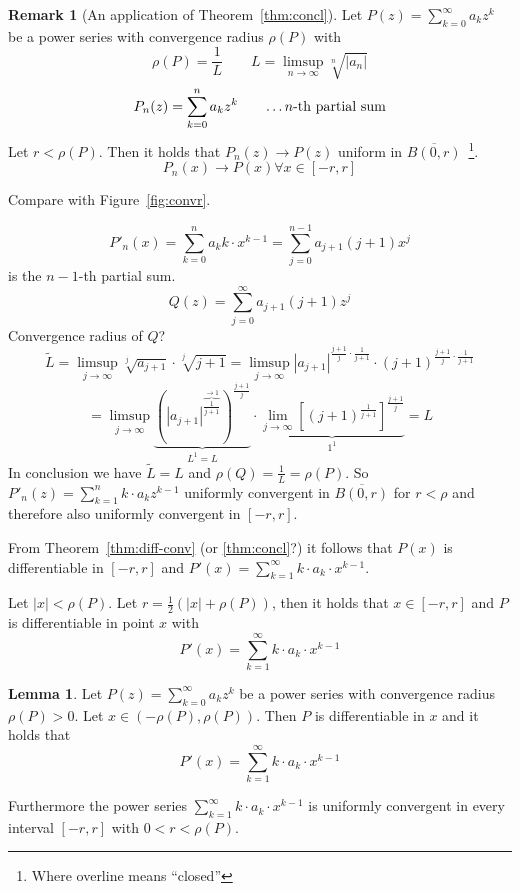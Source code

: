 \documentclass[a4paper,landscape,twocolumn]{article}
\theoremstyle{definition}
\newtheorem{rem}{Remark}
\newtheorem{lemma}{Lemma}
\newcommand\abs[1]{\left|#1\right|}
\begin{document}
\begin{rem}[An application of Theorem~\ref{thm:concl}]
  Let $P(z) = \sum_{k=0}^\infty a_k z^k$ be a power series with convergence radius $\rho(P)$ with
  \[ \rho(P) = \frac1L \qquad L = \limsup_{n\to\infty} \sqrt[n]{\abs{a_n}} \]
  \[ P_n(z) = \sum_{k=0}^n a_k z^k \qquad \text{\dots $n$-th partial sum} \]
  Let $r < \rho(P)$. Then it holds that $P_n(z) \to P(z)$ uniform in $\overline{B(0,r)}$~\footnote{Where overline means \enquote{closed}}.
  \[ P_n(x) \to P(x) \forall x \in [-r, r] \]

  Compare with Figure~\ref{fig:convr}.

  \[ P'_n(x) = \sum_{k=0}^n a_k k \cdot x^{k-1} = \sum_{j=0}^{n-1} a_{j+1} (j + 1) x^j \]
  is the $n-1$-th partial sum.
  \[ Q(z) = \sum_{j=0}^\infty a_{j+1} (j + 1) z^j \]
  Convergence radius of $Q$?
  \[ \tilde{L} = \limsup_{j\to\infty} \sqrt[j]{a_{j+1}} \cdot \sqrt[j]{j + 1} = \limsup_{j \to \infty} \abs{a_{j+1}}^{\frac{j+1}{j} \cdot \frac{1}{j+1}} \cdot (j+1)^{\frac{j+1}{j} \cdot \frac{1}{j+1}} \]
  \[
    = \limsup_{j\to\infty} \underbrace{\left(\abs{a_{j+1}}^{\overbrace{\frac{1}{j+1}}^{\to 1}}\right)^{\frac{j+1}{j}}}_{L^1 = L}
    \cdot \underbrace{\lim_{j\to\infty} \left[(j+1)^{\frac{1}{j+1}}\right]^{\frac{j+1}{j}}}_{1^1}
    = L
  \]
  In conclusion we have $\tilde L = L$ and $\rho(Q) = \frac1{L} = \rho(P)$.
  So $P'_n(z) = \sum_{k=1}^n k \cdot a_k z^{k-1}$ uniformly convergent in $\overline{B(0,r)}$ for $r<\rho$
  and therefore also uniformly convergent  in $[-r,r]$.

  From Theorem~\ref{thm:diff-conv} (or \ref{thm:concl}?) it follows that $P(x)$ is differentiable %
  in $[-r,r]$ and $P'(x) = \sum_{k=1}^\infty k \cdot a_k \cdot x^{k-1}$.

  Let $\abs{x} < \rho(P)$. Let $r = \frac12 (\abs{x} + \rho(P))$, then it holds that
  $x \in [-r, r]$ and $P$ is differentiable in point $x$ with
  \[ P'(x) = \sum_{k=1}^\infty k \cdot a_k \cdot x^{k-1} \]
\end{rem}

\begin{lemma}
  Let $P(z) = \sum_{k=0}^\infty a_k z^k$ be a power series with convergence radius $\rho(P) > 0$.
  Let $x \in (-\rho(P), \rho(P))$. Then $P$ is differentiable in $x$ and it holds that
  \[ P'(x) = \sum_{k=1}^\infty k \cdot a_k \cdot x^{k-1} \]

  Furthermore the power series $\sum_{k=1}^\infty k \cdot a_k \cdot x^{k-1}$ is uniformly convergent
  in every interval $[-r, r]$ with $0 < r < \rho(P)$.
\end{lemma}
\end{document}

